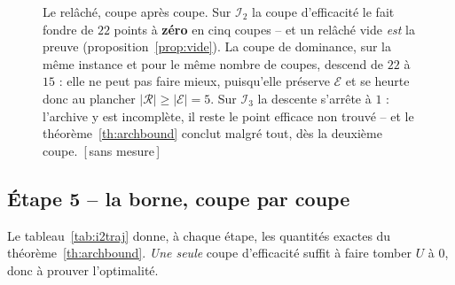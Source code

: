 \documentclass[11pt,a4paper]{article}
\theoremstyle{plain}
\theoremstyle{remark}
\newcommand{\Ecal}{\mathcal{E}}
\newcommand{\Rcal}{\mathcal{R}}
\newcommand{\confna}{\textsf{\footnotesize[\,sans mesure\,]}}
\begin{document}
\begin{figure}[H]
\centering
{}
\caption{Le relâché, coupe après coupe. Sur $\mathcal{I}_2$ la coupe
d'efficacité le fait fondre de $22$ points à \textbf{zéro} en cinq coupes --
et un relâché vide \emph{est} la preuve (proposition~\ref{prop:vide}). La
coupe de dominance, sur la même instance et pour le même nombre de coupes,
descend de $22$ à $15$ : elle ne peut pas faire mieux, puisqu'elle préserve
$\Ecal$ et se heurte donc au plancher $|\Rcal|\ge|\Ecal|=5$. Sur
$\mathcal{I}_3$ la descente s'arrête à $1$ : l'archive y est incomplète, il
reste le point efficace non trouvé -- et le théorème~\ref{th:archbound}
conclut malgré tout, dès la deuxième coupe.\ \confna}
\label{fig:trajrelache}
\end{figure}

\subsection{Étape 5 -- la borne, coupe par coupe}

Le tableau~\ref{tab:i2traj} donne, à chaque étape, les quantités exactes du
théorème~\ref{th:archbound}. \emph{Une seule} coupe d'efficacité suffit à
faire tomber $U$ à $0$, donc à prouver l'optimalité.
\end{document}
